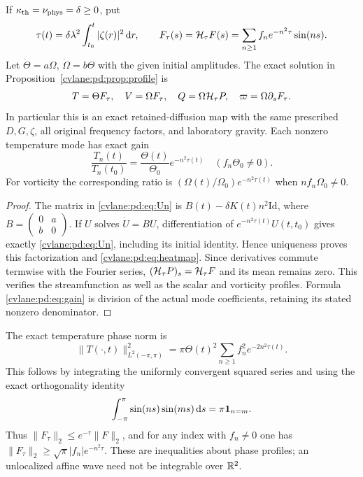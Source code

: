 \begin{cvlanepdproposition}\label{cvlane:pd:prop:heat}
If $\kappa_{\rm th}=\nu_{\rm phys}=\delta\geq0$, put
\begin{equation}\label{cvlane:pd:eq:heattime}
 \tau(t)=\delta\lambda^2\int_{t_0}^t|\zeta(r)|^2\,\mathrm d r,
 \qquad
 F_{\tau}(s)=\mathcal H_{\tau}F(s)=\sum_{n\geq1}f_ne^{-n^2\tau}\sin(ns).
\end{equation}
Let $\dot\Theta=a\Omega$, $\dot\Omega=b\Theta$ with the given initial
amplitudes. The exact solution in Proposition~\ref{cvlane:pd:prop:profile} is
\begin{equation}\label{cvlane:pd:eq:heatmap}
 T=\Theta F_\tau,\quad V=\Omega F_\tau,\quad
 Q=\Omega\mathcal H_\tau P,
 \quad \varpi=\Omega\partial_sF_\tau.
\end{equation}
In particular this is an exact retained-diffusion map with the same
prescribed $D,G,\zeta$, all original frequency factors, and laboratory
gravity. Each nonzero temperature mode has exact gain
\begin{equation}\label{cvlane:pd:eq:gain}
 \frac{T_n(t)}{T_n(t_0)}
   =\frac{\Theta(t)}{\Theta_0}e^{-n^2\tau(t)}
 \quad(f_n\Theta_0\ne0).
\end{equation}
For vorticity the corresponding ratio is
$(\Omega(t)/\Omega_0)e^{-n^2\tau(t)}$ when $nf_n\Omega_0\ne0$.
\end{cvlanepdproposition}
\begin{proof}
The matrix in \eqref{cvlane:pd:eq:Un} is $B(t)-\delta K(t)n^2\mathrm{Id}$,
where $B=\left(\begin{smallmatrix}0&a\\b&0\end{smallmatrix}\right)$.
If $U$ solves $\dot U=BU$, differentiation of
$e^{-n^2\tau(t)}U(t,t_0)$ gives exactly \eqref{cvlane:pd:eq:Un}, including its
initial identity. Hence uniqueness proves this factorization and
\eqref{cvlane:pd:eq:heatmap}. Since derivatives commute termwise with the Fourier
series, $(\mathcal H_\tau P)_s=\mathcal H_\tau F$ and its mean remains zero.
This verifies the streamfunction as well as the scalar and vorticity
profiles. Formula \eqref{cvlane:pd:eq:gain} is division of the actual mode
coefficients, retaining its stated nonzero denominator.
\end{proof}

The exact temperature phase norm is
\begin{equation}\label{cvlane:pd:eq:norm}
 \|T(\cdot,t)\|_{L^2(-\pi,\pi)}^2
 =\pi\Theta(t)^2\sum_{n\geq1}f_n^2e^{-2n^2\tau(t)}.
\end{equation}
This follows by integrating the uniformly convergent squared series and
using the exact orthogonality identity
\[
 \int_{-\pi}^{\pi}\sin(ns)\sin(ms)\,\mathrm d s=\pi\mathbf1_{n=m}.
\]
Thus $\|F_\tau\|_2\leq e^{-\tau}\|F\|_2$, and for any index with
$f_n\ne0$ one has $\|F_\tau\|_2\geq\sqrt\pi|f_n|e^{-n^2\tau}$.
These are inequalities about phase profiles; an unlocalized affine wave
need not be integrable over $\mathbb R^2$.

